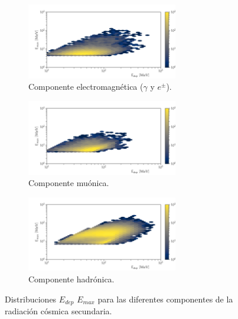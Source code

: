\begin{figure}
        \centering
        \begin{subfigure}[b]{\textwidth}
                \includegraphics[width=0.725\textwidth]{scibar-em.pdf}
                \caption*{Componente electromagnética ($\gamma$ y $e^{\pm}$).}
        \end{subfigure}
        \begin{subfigure}[b]{\textwidth}
                \includegraphics[width=0.725\textwidth]{scibar-mu.pdf}
                \caption*{Componente muónica.}
        \end{subfigure}
        \begin{subfigure}[b]{\textwidth}
                \includegraphics[width=0.725\textwidth]{scibar-had.pdf}
                \caption*{Componente hadrónica.}
        \end{subfigure}
        \caption{Distribuciones $E_{dep}$  $E_{max}$ para las diferentes componentes de la radiación cósmica secundaria.}
        \label{fig:scicrt-edep-emax}
\end{figure}

